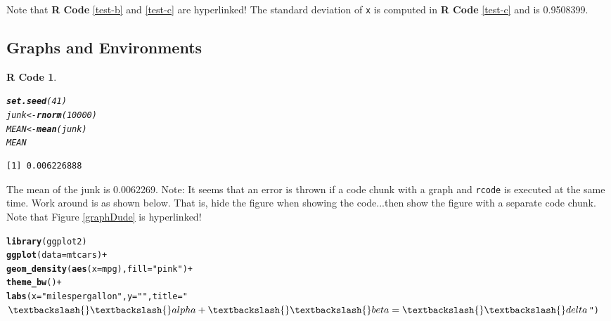 \documentclass{article}\usepackage[]{graphicx}\usepackage[]{color}
\makeatletter
\newcommand{\hlnum}[1]{\textcolor[rgb]{0.686,0.059,0.569}{#1}}%
\newcommand{\hlstr}[1]{\textcolor[rgb]{0.192,0.494,0.8}{#1}}%
\newcommand{\hlopt}[1]{\textcolor[rgb]{0,0,0}{#1}}%
\newcommand{\hlstd}[1]{\textcolor[rgb]{0.345,0.345,0.345}{#1}}%
\newcommand{\hlkwb}[1]{\textcolor[rgb]{0.69,0.353,0.396}{#1}}%
\newcommand{\hlkwc}[1]{\textcolor[rgb]{0.333,0.667,0.333}{#1}}%
\newcommand{\hlkwd}[1]{\textcolor[rgb]{0.737,0.353,0.396}{\textbf{#1}}}%
\newenvironment{kframe}{%
 \def\at@end@of@kframe{}%
 \ifinner\ifhmode%
  \def\at@end@of@kframe{\end{minipage}}%
  \begin{minipage}{\columnwidth}%
 \fi\fi%
 \def\FrameCommand##1{\hskip\@totalleftmargin \hskip-\fboxsep
 \colorbox{shadecolor}{##1}\hskip-\fboxsep
     \hskip-\linewidth \hskip-\@totalleftmargin \hskip\columnwidth}%
 \MakeFramed {\advance\hsize-\width
   \@totalleftmargin\z@ \linewidth\hsize
   \@setminipage}}%
 {\par\unskip\endMakeFramed%
 \at@end@of@kframe}
\newenvironment{knitrout}{}{} %
\theoremstyle{rcode}
\newtheorem{rcode}{R Code}[section]
\makeatother
\begin{document}
Note that \textbf{R Code} \vref{test-b} and \vref{test-c} are hyperlinked!  The standard deviation of \texttt{x} is computed in \textbf{R Code} \vref{test-c} and is 0.9508399.

\clearpage
\subsection{Graphs and Environments}

\begin{knitrout}
\color{fgcolor}\begin{kframe}
\begin{rcode}\label{plot1}\hfill{}\begin{alltt}
\hlkwd{set.seed}\hlstd{(}\hlnum{41}\hlstd{)}
\hlstd{junk} \hlkwb{<-} \hlkwd{rnorm}\hlstd{(}\hlnum{10000}\hlstd{)}
\hlstd{MEAN} \hlkwb{<-} \hlkwd{mean}\hlstd{(junk)}
\hlstd{MEAN}
\end{alltt}
\begin{verbatim}
[1] 0.006226888
\end{verbatim}
\end{rcode}\end{kframe}
\end{knitrout}

The mean of the junk is 0.0062269.  Note: It seems that an error is thrown if
a code chunk with a graph and \texttt{rcode} is executed at the same time.  Work around is
as shown below.  That is, hide the figure when showing the code...then show the figure
with a separate code chunk.  Note that Figure \vref{graphDude} is hyperlinked!

\begin{knitrout}
\color{fgcolor}\begin{kframe}
\begin{alltt}
\hlkwd{library}\hlstd{(ggplot2)}
\hlkwd{ggplot}\hlstd{(}\hlkwc{data} \hlstd{= mtcars)} \hlopt{+}
  \hlkwd{geom_density}\hlstd{(}\hlkwd{aes}\hlstd{(}\hlkwc{x} \hlstd{= mpg),} \hlkwc{fill} \hlstd{=} \hlstr{"pink"}\hlstd{)} \hlopt{+}
  \hlkwd{theme_bw}\hlstd{()} \hlopt{+}
  \hlkwd{labs}\hlstd{(}\hlkwc{x} \hlstd{=} \hlstr{"miles per gallon"}\hlstd{,} \hlkwc{y} \hlstd{=} \hlstr{""}\hlstd{,} \hlkwc{title} \hlstd{=} \hlstr{"$\textbackslash{}\textbackslash{}alpha + \textbackslash{}\textbackslash{}beta = \textbackslash{}\textbackslash{}delta$"}\hlstd{)}
\end{alltt}
\end{kframe}
\end{knitrout}
\end{document}
